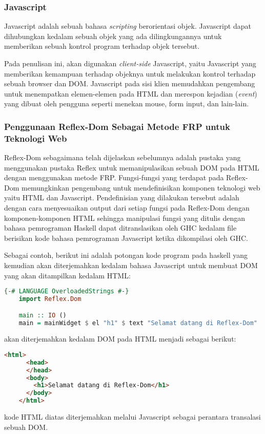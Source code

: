 \documentclass[pi.tex]{subfile}
\begin{document}
\subsubsection{Javascript}\hspace{10pt}
Javascript adalah sebuah bahasa \emph{scripting} berorientasi objek. Javascript dapat dihubungkan kedalam sebuah objek yang ada dilingkungannya untuk memberikan sebuah kontrol program terhadap objek tersebut.

\hspace{10pt}Pada penulisan ini, akan digunakan \emph{client-side} Javascript, yaitu Javascript yang memberikan kemampuan terhadap objeknya untuk melakukan kontrol terhadap sebuah browser dan DOM. Javascript pada sisi klien memudahkan pengembang untuk menempatkan elemen-elemen pada HTML dan merespon kejadian (\emph{event}) yang dibuat oleh pengguna seperti menekan mouse, form input, dan lain-lain.

\subsubsection{Penggunaan Reflex-Dom Sebagai Metode FRP untuk Teknologi Web}\hspace{10pt}
Reflex-Dom sebagaimana telah dijelaskan sebelumnya adalah pustaka yang menggunakan pustaka Reflex untuk memanipulasikan sebuah DOM pada HTML dengan menggunakan metode FRP. Fungsi-fungsi yang terdapat pada Reflex-Dom memungkinkan pengembang untuk mendefinisikan komponen teknologi web yaitu HTML dan Javascript. Pendefinisian yang dilakukan tersebut adalah dengan cara menyesuaikan output dari setiap fungsi pada Reflex-Dom dengan komponen-komponen HTML sehingga manipulasi fungsi yang ditulis dengan bahasa pemrograman Haskell dapat ditranslasikan oleh GHC kedalam file berisikan kode bahasa pemrograman Javascript ketika dikompilasi oleh GHC.

\hspace{10pt}Sebagai contoh, berikut ini adalah potongan kode program pada haskell yang kemudian akan diterjemahkan kedalam bahasa Javascript untuk membuat DOM yang akan ditampilkan kedalam HTML:\\

  \begin{lstlisting}[language=Haskell]
    {-# LANGUAGE OverloadedStrings #-}
    import Reflex.Dom

    main :: IO ()
    main = mainWidget $ el "h1" $ text "Selamat datang di Reflex-Dom"
  \end{lstlisting}
  akan diterjemahkan kedalam DOM pada HTML menjadi sebagai berikut:
\\
  \begin{lstlisting}[language=HTML]
    <html>
      <head>
      </head>
      <body>
        <h1>Selamat datang di Reflex-Dom</h1>
      </body>
    </html>
  \end{lstlisting}
  kode HTML diatas diterjemahkan melalui Javascript sebagai perantara transalasi sebuah DOM.
\end{document}
